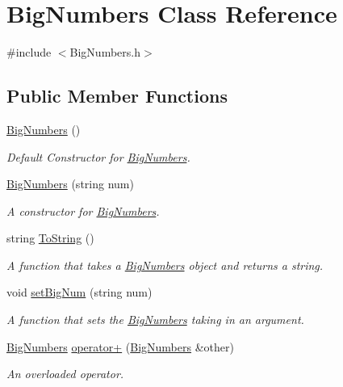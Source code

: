 \hypertarget{class_big_numbers}{}\section{Big\+Numbers Class Reference}
\label{class_big_numbers}


{\ttfamily \#include $<$Big\+Numbers.\+h$>$}

\subsection*{Public Member Functions}
\begin{DoxyCompactItemize}
\item 
\mbox{\hyperlink{class_big_numbers_af3dd82883f10f3473ac83280f26b0ad8}{Big\+Numbers}} ()
\begin{DoxyCompactList}\small\item\em Default Constructor for \mbox{\hyperlink{class_big_numbers}{Big\+Numbers}}. \end{DoxyCompactList}\item 
\mbox{\hyperlink{class_big_numbers_a9052f67b5cdbab8a22310d9133fe1bb5}{Big\+Numbers}} (string num)
\begin{DoxyCompactList}\small\item\em A constructor for \mbox{\hyperlink{class_big_numbers}{Big\+Numbers}}. \end{DoxyCompactList}\item 
string \mbox{\hyperlink{class_big_numbers_a326c5e36f8b346e85050909536a1a666}{To\+String}} ()
\begin{DoxyCompactList}\small\item\em A function that takes a \mbox{\hyperlink{class_big_numbers}{Big\+Numbers}} object and returns a string. \end{DoxyCompactList}\item 
void \mbox{\hyperlink{class_big_numbers_acc7490767828ba1addc49d07a5be3757}{set\+Big\+Num}} (string num)
\begin{DoxyCompactList}\small\item\em A function that sets the \mbox{\hyperlink{class_big_numbers}{Big\+Numbers}} taking in an argument. \end{DoxyCompactList}\item 
\mbox{\hyperlink{class_big_numbers}{Big\+Numbers}} \mbox{\hyperlink{class_big_numbers_a8d4f622ba90fbad6d41392caad0f83b5}{operator+}} (\mbox{\hyperlink{class_big_numbers}{Big\+Numbers}} \&other)
\begin{DoxyCompactList}\small\item\em An overloaded operator. \end{DoxyCompactList}\item 

\end{DoxyCompactItemize}
